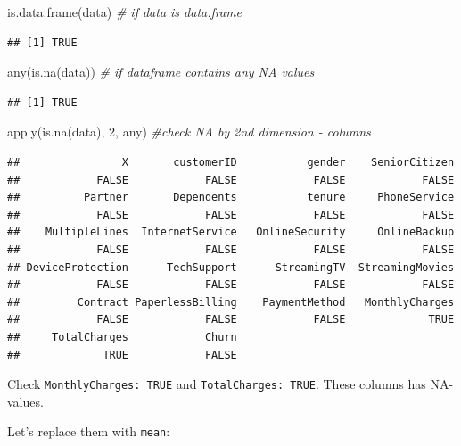 \documentclass[
]{book}
\newenvironment{Shaded}{\begin{snugshade}}{\end{snugshade}}
\newcommand{\CommentTok}[1]{\textcolor[rgb]{0.56,0.35,0.01}{\textit{#1}}}
\newcommand{\DecValTok}[1]{\textcolor[rgb]{0.00,0.00,0.81}{#1}}
\newcommand{\FunctionTok}[1]{\textcolor[rgb]{0.00,0.00,0.00}{#1}}
\newcommand{\NormalTok}[1]{#1}
\begin{document}
\begin{Shaded}
\begin{Highlighting}[]
\FunctionTok{is.data.frame}\NormalTok{(data) }\CommentTok{\# if data is data.frame}
\end{Highlighting}
\end{Shaded}

\begin{verbatim}
## [1] TRUE
\end{verbatim}

\begin{Shaded}
\begin{Highlighting}[]
\FunctionTok{any}\NormalTok{(}\FunctionTok{is.na}\NormalTok{(data)) }\CommentTok{\# if dataframe contains any NA values}
\end{Highlighting}
\end{Shaded}

\begin{verbatim}
## [1] TRUE
\end{verbatim}

\begin{Shaded}
\begin{Highlighting}[]
\FunctionTok{apply}\NormalTok{(}\FunctionTok{is.na}\NormalTok{(data), }\DecValTok{2}\NormalTok{, any) }\CommentTok{\#check NA by 2nd dimension {-} columns}
\end{Highlighting}
\end{Shaded}

\begin{verbatim}
##                X       customerID           gender    SeniorCitizen 
##            FALSE            FALSE            FALSE            FALSE 
##          Partner       Dependents           tenure     PhoneService 
##            FALSE            FALSE            FALSE            FALSE 
##    MultipleLines  InternetService   OnlineSecurity     OnlineBackup 
##            FALSE            FALSE            FALSE            FALSE 
## DeviceProtection      TechSupport      StreamingTV  StreamingMovies 
##            FALSE            FALSE            FALSE            FALSE 
##         Contract PaperlessBilling    PaymentMethod   MonthlyCharges 
##            FALSE            FALSE            FALSE             TRUE 
##     TotalCharges            Churn 
##             TRUE            FALSE
\end{verbatim}

Check \texttt{MonthlyCharges:\ TRUE} and \texttt{TotalCharges:\ TRUE}. These columns has NA-values.

Let's replace them with \texttt{mean}:
\end{document}
